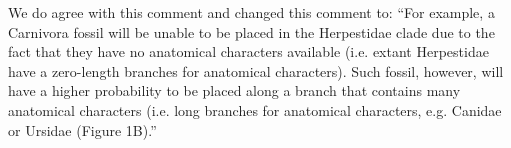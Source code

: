 \documentclass[12pt,letterpaper]{article}
\begin{document}
\begin{enumerate}
We do agree with this comment and changed this comment to:
``For example, a Carnivora fossil will be unable to be placed in the Herpestidae clade due to the fact that they have no anatomical characters available (i.e. extant Herpestidae have a zero-length branches for anatomical characters).
Such fossil, however, will have a higher probability to be placed along a branch that contains many anatomical characters (i.e. long branches for anatomical characters, e.g. Canidae or Ursidae (Figure 1B).''


\end{enumerate}

\end{document}
